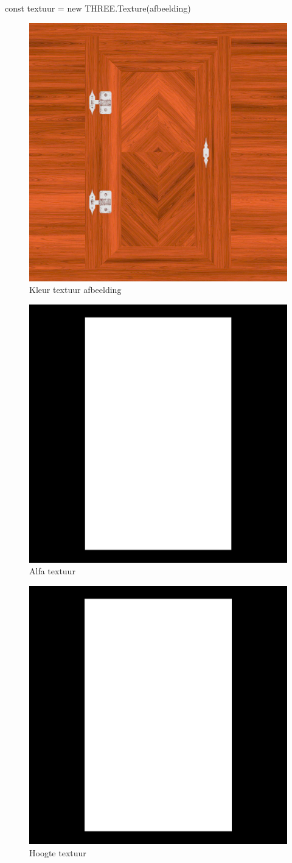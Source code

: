 \begin{LVerbatim}
const textuur = new THREE.Texture(afbeelding)
\end{LVerbatim}

\begin{figure}
	\centering
	\includegraphics[width=.5\linewidth]{graphics/colorTexture}
	\caption[Kleur textuur afbeelding]{Kleur textuur afbeelding}
	\label{fig:colorTexture}
\end{figure}
\begin{figure}
	\centering
	\includegraphics[width=.5\linewidth]{graphics/alphaTexture}
	\caption[Alfa textuur]{Alfa textuur}
	\label{fig:alphaTexture}
\end{figure}
\begin{figure}
	\centering
	\includegraphics[width=.5\linewidth]{graphics/heightTexture}
	\caption[Hoogte textuur]{Hoogte textuur}
	\label{fig:heightTexture}
\end{figure}

